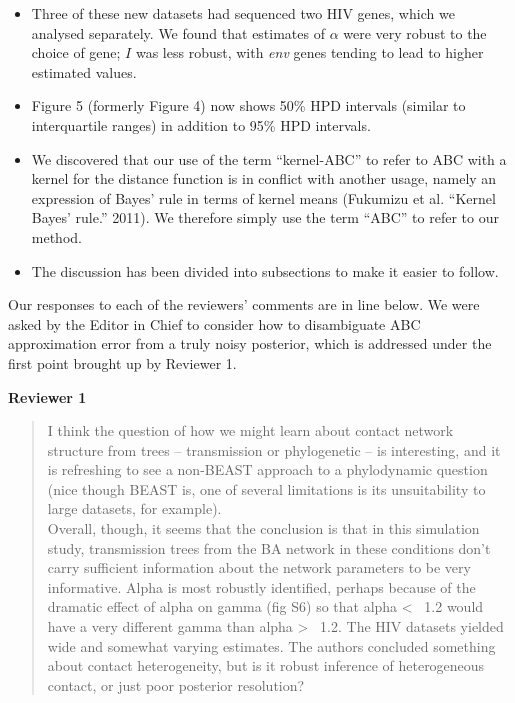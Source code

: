 \documentclass[12pt]{letter}
\begin{document}
\begin{letter}{ }
\begin{itemize}
  \item Three of these new datasets had sequenced two HIV genes, which we
    analysed separately. We found that estimates of $\alpha$ were very robust
    to the choice of gene; $I$ was less robust, with \textit{env} genes tending
    to lead to higher estimated values.
  \item Figure 5 (formerly Figure 4) now shows 50\% HPD intervals (similar to
    interquartile ranges) in addition to 95\% HPD intervals.
  \item We discovered that our use of the term ``kernel-ABC'' to refer to ABC 
    with a kernel for the distance function is in conflict with another usage,
    namely an expression of Bayes' rule in terms of kernel means (Fukumizu et
    al. ``Kernel Bayes' rule.'' 2011). We therefore simply use the term ``ABC''
    to refer to our method.
  \item The discussion has been divided into subsections to make it easier to
    follow.
\end{itemize}

Our responses to each of the reviewers' comments are in line below. We were
asked by the Editor in Chief to consider how to disambiguate ABC approximation
error from a truly noisy posterior, which is addressed under the first point
brought up by Reviewer 1.

\textbf{Reviewer 1}

\begin{quote}
  \itshape

  I think the question of how we might learn about contact network structure
  from trees -- transmission or phylogenetic -- is interesting, and it is
  refreshing to see a non-BEAST approach to a phylodynamic question (nice
  though BEAST is, one of several limitations is its unsuitability to large
  datasets, for example). \\

  Overall, though, it seems that the conclusion is that in this simulation
  study, transmission trees from the BA network in these conditions don't carry
  sufficient information about the network parameters to be very informative.
  Alpha is most robustly identified, perhaps because of the dramatic effect of
  alpha on gamma (fig S6) so that alpha < ~1.2 would have a very different
  gamma than alpha > ~1.2. The HIV datasets yielded wide and somewhat varying
  estimates. The authors concluded something about contact heterogeneity, but
  is it robust inference of heterogeneous contact, or just poor posterior
  resolution?
\end{quote}


\end{letter}
\end{document}
